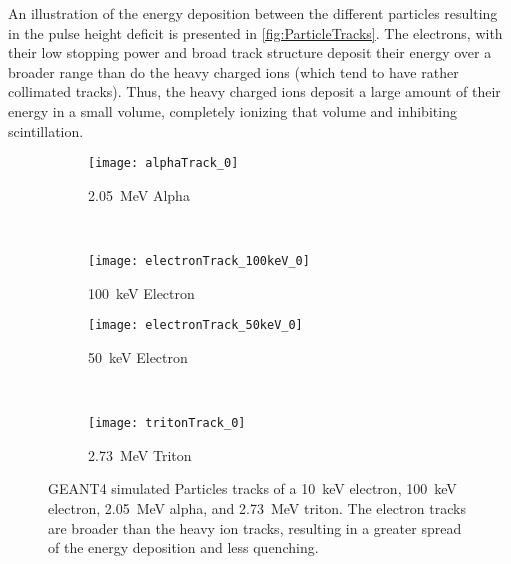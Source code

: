 An illustration of the energy deposition between the different particles resulting in the pulse height deficit is presented in \autoref{fig:ParticleTracks}.
The electrons, with their low stopping power and broad track structure deposit their energy over a broader range than do the heavy charged ions (which tend to have rather collimated tracks).
Thus, the heavy charged ions deposit a large amount of their energy in a small volume, completely ionizing that volume and inhibiting scintillation.
\begin{figure}
  \begin{subfigure}[b]{0.45\textwidth}
    \texttt{[image: alphaTrack\_0]}
    \caption{\SI{2.05}{\MeV} Alpha}
  \end{subfigure}%
  ~
  \begin{subfigure}[b]{0.45\textwidth}
    \texttt{[image: electronTrack\_100keV\_0]}
    \caption{\SI{100}{\keV} Electron}
  \end{subfigure}
  
  \begin{subfigure}[b]{0.45\textwidth}
    \texttt{[image: electronTrack\_50keV\_0]}
    \caption{\SI{50}{\keV} Electron}
  \end{subfigure}%
  ~
  \begin{subfigure}[b]{0.45\textwidth}
    \texttt{[image: tritonTrack\_0]}
    \caption{\SI{2.73}{\MeV} Triton}
  \end{subfigure}
  \caption[Particle Tracks of Alpha, Triton and Electrons]{GEANT4 simulated Particles tracks of a \SI{10}{\keV} electron, \SI{100}{\keV} electron, \SI{2.05}{\MeV} alpha, and \SI{2.73}{\MeV} triton.  The electron tracks are broader than the heavy ion tracks, resulting in a greater spread of the energy deposition and less quenching.}
  \label{fig:ParticleTracks}
\end{figure}

